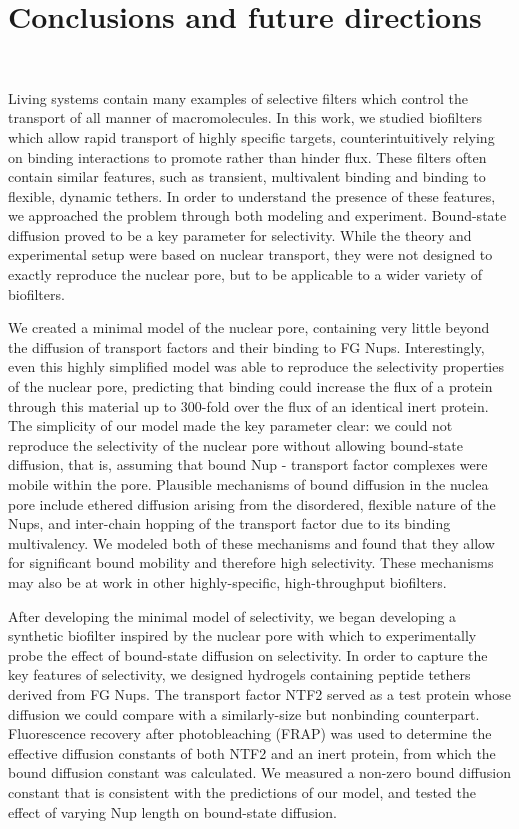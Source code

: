 \chapter{Conclusions and future directions}~\label{ch06_conclusions}

Living systems contain many examples of selective filters which control the transport of all manner of macromolecules.  In this work, we studied biofilters which allow rapid transport of highly specific targets, counterintuitively relying on binding interactions to promote rather than hinder flux.  These filters often contain similar features, such as transient, multivalent binding and binding to flexible, dynamic tethers.  In order to understand the presence of these features, we approached the problem through both modeling and experiment.  Bound-state diffusion proved to be a key parameter for selectivity.  While the theory and experimental setup were based on nuclear transport, they were not designed to exactly reproduce the nuclear pore, but to be applicable to a wider variety of biofilters.

We created a minimal model of the nuclear pore, containing very little beyond the diffusion of transport factors and their binding to FG Nups.  Interestingly, even this highly simplified model was able to reproduce the selectivity properties of the nuclear pore, predicting that binding could increase the flux of a protein through this material up to 300-fold over the flux of an identical inert protein.  The simplicity of our model made the key parameter clear: we could not reproduce the selectivity of the nuclear pore without allowing bound-state diffusion, that is, assuming that bound Nup - transport factor complexes were mobile within the pore.  Plausible mechanisms of bound diffusion in the nuclea pore include ethered diffusion arising from the disordered, flexible nature of the Nups, and inter-chain hopping of the transport factor due to its binding multivalency.  We modeled both of these mechanisms and found that they allow for significant bound mobility and therefore high selectivity.  These mechanisms may also be at work in other highly-specific, high-throughput biofilters.

After developing the minimal model of selectivity, we began developing a synthetic biofilter inspired by the nuclear pore with which to experimentally probe the effect of bound-state diffusion  on selectivity.  In order to capture the key features of selectivity, we designed hydrogels containing peptide tethers derived from FG Nups.  The transport factor NTF2 served as a test protein whose diffusion we could compare with a similarly-size but nonbinding counterpart.  Fluorescence recovery after photobleaching (FRAP) was used to determine the effective diffusion constants of both NTF2 and an inert protein, from which the bound diffusion constant was calculated. We measured a non-zero bound diffusion constant that is consistent with the predictions of our model, and tested the effect of varying Nup length on bound-state diffusion.

